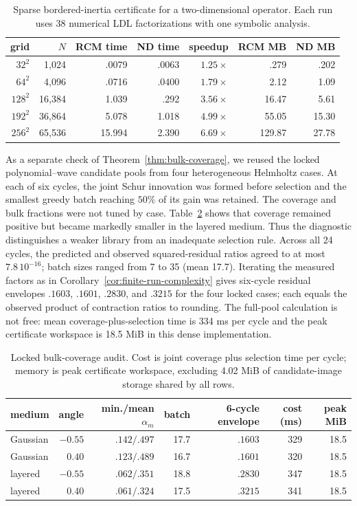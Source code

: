 \documentclass[11pt]{article}
\numberwithin{algorithm}{section}
\theoremstyle{definition}\newtheorem{definition}[theorem]{Definition}
\theoremstyle{remark}\newtheorem{remark}[theorem]{Remark}
\begin{document}
\begin{table}[H]
\centering
\caption{Sparse bordered-inertia certificate for a two-dimensional operator.
Each run uses 38 numerical LDL factorizations with one symbolic analysis.}
\label{tab:main-sparse-2d}
\begin{tabular}{rrrrrrr}
\toprule
grid & $N$ & RCM time & ND time & speedup & RCM MB & ND MB\\
\midrule
$32^2$  & 1,024  & .0079 & .0063 & $1.25\times$ & .279 & .202\\
$64^2$  & 4,096  & .0716 & .0400 & $1.79\times$ & 2.12 & 1.09\\
$128^2$ & 16,384 & 1.039 & .292 & $3.56\times$ & 16.47 & 5.61\\
$192^2$ & 36,864 & 5.078 & 1.018 & $4.99\times$ & 55.05 & 15.30\\
$256^2$ & 65,536 & 15.994 & 2.390 & $6.69\times$ & 129.87 & 27.78\\
\bottomrule
\end{tabular}
\end{table}

As a separate check of Theorem~\ref{thm:bulk-coverage}, we reused the locked
polynomial--wave candidate pools from four heterogeneous Helmholtz cases.  At
each of six cycles, the joint Schur innovation was formed before selection and
the smallest greedy batch reaching $50\%$ of its gain was retained.  The
coverage and bulk fractions were not tuned by case.  Table~\ref{tab:bulk-audit}
shows that coverage remained positive but became markedly smaller in the
layered medium.  Thus the diagnostic distinguishes a weaker library from an
inadequate selection rule.  Across all 24 cycles, the predicted and observed
squared-residual ratios agreed to at most $7.8\,10^{-16}$; batch sizes ranged
from 7 to 35 (mean 17.7).  Iterating the measured factors as in
Corollary~\ref{cor:finite-run-complexity} gives six-cycle residual envelopes
$.1603$, $.1601$, $.2830$, and $.3215$ for the four locked cases; each equals
the observed product of contraction ratios to rounding.  The full-pool calculation is not free: mean
coverage-plus-selection time is 334 ms per cycle and the peak certificate
workspace is 18.5 MiB in this dense implementation.

\begin{table}[H]
\centering
\caption{Locked bulk-coverage audit.  Cost is joint coverage plus selection
time per cycle; memory is peak certificate workspace, excluding 4.02 MiB of
candidate-image storage shared by all rows.}
\label{tab:bulk-audit}
\begin{tabular}{lrrrrrr}
\toprule
medium & angle & min./mean $\alpha_m$ & batch & 6-cycle envelope & cost (ms) & peak MiB\\
\midrule
Gaussian & $-0.55$ & $.142/.497$ & 17.7 & $.1603$ & 329 & 18.5\\
Gaussian & $ 0.40$ & $.123/.489$ & 16.7 & $.1601$ & 320 & 18.5\\
layered  & $-0.55$ & $.062/.351$ & 18.8 & $.2830$ & 347 & 18.5\\
layered  & $ 0.40$ & $.061/.324$ & 17.5 & $.3215$ & 341 & 18.5\\
\bottomrule
\end{tabular}
\end{table}
\end{document}
